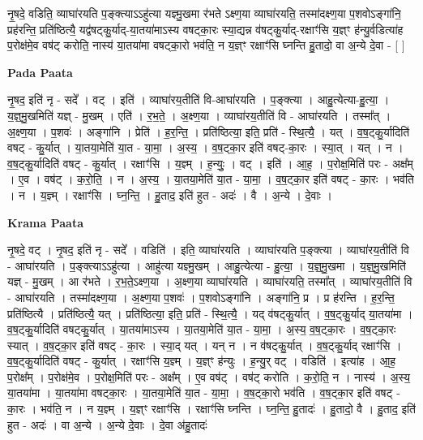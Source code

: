 \documentclass[17pt]{extarticle}
\begin{document}
नृ॒षदे॒ वडिति॒ व्याघा॑रयति प॒ङ्क्त्याऽऽहु॑त्या यज्ञ्मु॒खमा र॑भते ऽक्ष्ण॒या व्याघा॑रयति॒ तस्मा॑दक्ष्ण॒या प॒शवोऽङ्गा॑नि॒ प्रह॑रन्ति॒ प्रति॑ष्ठित्यै॒ यद्व॑षट्कु॒र्याद्-या॒तया॑माऽस्य वषट्का॒रः स्या॒द्यन्न व॑षट्कु॒र्याद्-रक्षाꣳ॑सि य॒ज्ञ्ꣳ ह॑न्यु॒र्वडित्या॑ह प॒रोक्ष॑मे॒व वष॑ट् करोति॒ नास्य॑ या॒तया॑मा वषट्का॒रो भव॑ति॒ न य॒ज्ञ्ꣳ रक्षाꣳ॑सि घ्नन्ति हु॒तादो॒ वा अ॒न्ये दे॒वा - [  ] \newline

\textbf{Pada Paata} \newline

नृ॒षद॒ इति॑ नृ - सदे᳚ । वट् । इति॑ । व्याघा॑रय॒तीति॑ वि-आघा॑रयति । प॒ङ्क्त्या । आहु॒त्येत्या-हु॒त्या॒ । य॒ज्ञ्॒मु॒खमिति॑ यज्ञ् - मु॒खम् । एति॑ । र॒भ॒ते॒ । अ॒क्ष्ण॒या । व्याघा॑रय॒तीति॑ वि - आघा॑रयति । तस्मा᳚त् । अ॒क्ष्ण॒या । प॒शवः॑ । अङ्गा॑नि । प्रेति॑ । ह॒र॒न्ति॒ । प्रति॑ष्ठित्या॒ इति॒ प्रति॑ - स्थि॒त्यै॒ । यत् । व॒ष॒ट्कु॒र्यादिति॑ वषट् - कु॒र्यात् । या॒तया॒मेति॑ या॒त - या॒मा॒ । अ॒स्य॒ । व॒ष॒ट्का॒र इति॑ वषट्-का॒रः । स्या॒त् । यत् । न । व॒ष॒ट्कु॒र्यादिति॑ वषट् - कु॒र्यात् । रक्षाꣳ॑सि । य॒ज्ञ्म् । ह॒न्युः॒ । वट् । इति॑ । आ॒ह॒ । प॒रोक्ष॒मिति॑ परः - अक्ष᳚म् । ए॒व । वष॑ट् । क॒रो॒ति॒ । न । अ॒स्य॒ । या॒तया॒मेति॑ या॒त - या॒मा॒ । व॒ष॒ट्का॒र इति॑ वषट् - का॒रः । भव॑ति । न । य॒ज्ञ्म् । रक्षाꣳ॑सि । घ्न॒न्ति॒ । हु॒ताद॒ इति॑ हुत - अदः॑ । वै । अ॒न्ये । दे॒वाः ।  \newline


\textbf{Krama Paata} \newline

नृ॒षदे॒ वट् । नृ॒षद॒ इति॑ नृ - सदे᳚ । वडिति॑ । इति॒ व्याघा॑रयति । व्याघा॑रयति प॒ङ्क्त्या । व्याघा॑रय॒तीति॑ वि - आघा॑रयति । प॒ङ्क्त्याऽऽहु॑त्या । आहु॑त्या यज्ञ्मु॒खम् । आहु॒त्येत्या - हु॒त्या॒ । य॒ज्ञ्॒मु॒खमा । य॒ज्ञ्॒मु॒खमिति॑ यज्ञ् - मु॒खम् । आ र॑भते । र॒भ॒ते॒ऽक्ष्ण॒या । अ॒क्ष्ण॒या व्याघा॑रयति । व्याघा॑रयति॒ तस्मा᳚त् । व्याघा॑रय॒तीति॑ वि - आघा॑रयति । तस्मा॑दक्ष्ण॒या । अ॒क्ष्ण॒या प॒शवः॑ । प॒शवोऽङ्गा॑नि । अङ्गा॑नि॒ प्र । प्र ह॑रन्ति । ह॒र॒न्ति॒ प्रति॑ष्ठित्यै । प्रति॑ष्ठित्यै॒ यत् । प्रति॑ष्ठित्या॒ इति॒ प्रति॑ - स्थि॒त्यै॒ । यद् व॑षट्कु॒र्यात् । व॒ष॒ट्कु॒र्याद् या॒तया॑मा । व॒ष॒ट्कु॒र्यादिति॑ वषट्कु॒र्यात् । या॒तया॑माऽस्य । या॒तया॒मेति॑ या॒त - या॒मा॒ । अ॒स्य॒ व॒ष॒ट्का॒रः । व॒ष॒ट्का॒रः स्यात् । व॒ष॒ट्का॒र इति॑ वषट् - का॒रः । स्या॒द् यत् । यन् न । न व॑षट्कु॒र्यात् । व॒ष॒ट्कु॒र्याद् रक्षाꣳ॑सि । व॒ष॒ट्कु॒र्यादिति॑ वषट् - कु॒र्यात् । रक्षाꣳ॑सि य॒ज्ञ्म् । य॒ज्ञ्ꣳ ह॑न्युः । ह॒न्यु॒र् वट् । वडिति॑ । इत्या॑ह । आ॒ह॒ प॒रोक्ष᳚म् । प॒रोक्ष॑मे॒व । प॒रोक्ष॒मिति॑ परः - अक्ष᳚म् । ए॒व वष॑ट् । वष॑ट् करोति । क॒रो॒ति॒ न । नास्य॑ । अ॒स्य॒ या॒तया॑मा । या॒तया॑मा वषट्का॒रः । या॒तया॒मेति॑ या॒त - या॒मा॒ । व॒ष॒ट्का॒रो भव॑ति । व॒ष॒ट्का॒र इति॑ वषट् - का॒रः । भव॑ति॒ न । न य॒ज्ञ्म् । य॒ज्ञ्ꣳ रक्षाꣳ॑सि । रक्षाꣳ॑सि घ्नन्ति । घ्न॒न्ति॒ हु॒तादः॑ । हु॒तादो॒ वै । हु॒ताद॒ इति॑ हुत - अदः॑ । वा अ॒न्ये । अ॒न्ये दे॒वाः । दे॒वा अ॑हु॒तादः॑ \newline
\end{document}
